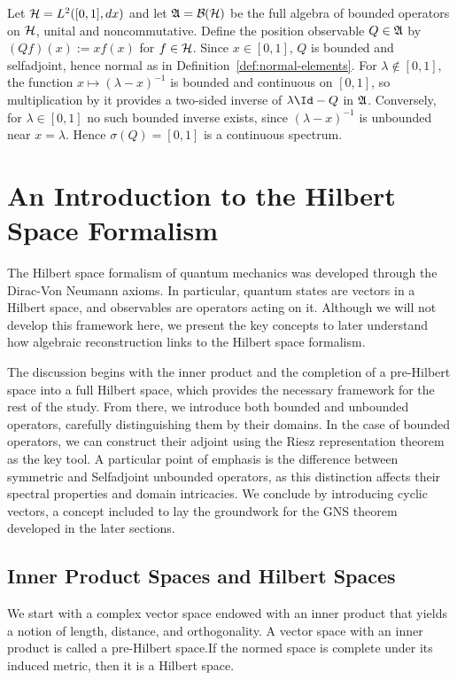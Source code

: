 \begin{example}\label{ex:position-algebra}
	Let $\H=L^2([0,1],dx)$ and let $\A=\mathcal{B}(\H)$ be
	the full algebra of bounded operators on $\H$, unital and
	noncommutative. Define the position observable $Q\in\mathfrak{A}$ by
	$(Qf)(x):=xf(x)$ for $f\in\H$. Since $x\in[0,1]$, $Q$ is
	bounded and selfadjoint, hence normal as in
	Definition~\ref{def:normal-elements}. For $\lambda\notin[0,1]$, the
	function $x\mapsto(\lambda-x)^{-1}$ is bounded and continuous on
	$[0,1]$, so multiplication by it provides a two-sided inverse of
	$\lambda\Id-Q$ in $\mathfrak{A}$. Conversely, for $\lambda\in[0,1]$ no such
	bounded inverse exists, since $(\lambda-x)^{-1}$ is unbounded near
	$x=\lambda$. Hence $\sigma(Q)=[0,1]$ is a continuous spectrum.
\end{example}
\section{An Introduction to the Hilbert Space Formalism}

The Hilbert space formalism of quantum mechanics was developed through the Dirac-Von Neumann axioms. In particular, quantum states are vectors in a Hilbert space, and observables are operators acting on it. Although we will not develop this framework here, we present the key concepts to later understand how algebraic reconstruction links to the Hilbert space formalism. 

The discussion begins with the inner product and the completion of a pre-Hilbert space into a full Hilbert space, which provides the necessary framework for the rest of the study. From there, we introduce both bounded and unbounded operators, carefully distinguishing them by their domains. In the case of bounded operators, we can construct their adjoint using the Riesz representation theorem as the key tool. A particular point of emphasis is the difference between symmetric and Selfadjoint unbounded operators, as this distinction affects their spectral properties and domain intricacies. We conclude by introducing cyclic vectors, a concept included to lay the groundwork for the GNS theorem developed in the later sections.

\subsection*{Inner Product Spaces and Hilbert Spaces}

We start with a complex vector space endowed with an inner product that yields a notion of length, distance, and orthogonality. A vector space with an inner product is called a pre-Hilbert space.If the normed space is complete under its induced metric, then it is a Hilbert space.

